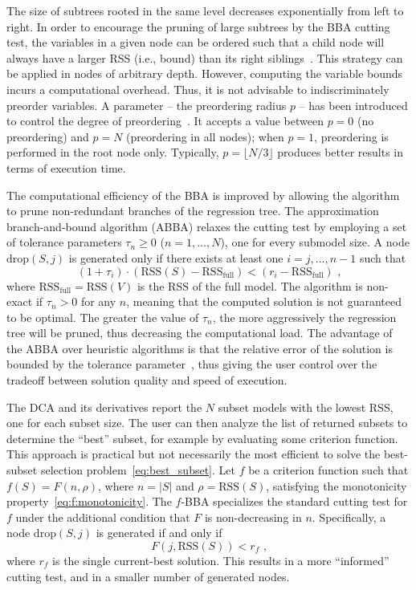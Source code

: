 \documentclass[article]{jss}
\newcommand{\qq}[1]{``{#1}''}
\newcommand{\drop}{\mathrm{drop}}
\newcommand{\rss}{\mathrm{RSS}}
\newcommand{\card}[1]{\left\lvert{#1}\right\rvert}
\begin{document}
The size of subtrees rooted in the same level decreases exponentially
from left to right.  In order to encourage the pruning of large
subtrees by the BBA cutting test, the variables in a given node can be
ordered such that a child node will always have a larger RSS (i.e.,
bound) than its right siblings~\citep{gatu:j_comput_graph_stat:06}.
This strategy can be applied in nodes of arbitrary depth.  However,
computing the variable bounds incurs a computational overhead.  Thus,
it is not advisable to indiscriminately preorder variables.  A
parameter -- the preordering radius $p$ -- has been introduced to
control the degree of
preordering~\citep{hofmann:comput_stat_data_an:07}.  It accepts a
value between $p=0$ (no preordering) and $p=N$ (preordering in all
nodes); when $p=1$, preordering is performed in the root node only.
Typically, $p=\lfloor N/3\rfloor$ produces better results in terms of
execution time.

The computational efficiency of the BBA is improved by allowing the
algorithm to prune non-redundant branches of the regression tree.  The
approximation branch-and-bound algorithm (ABBA) relaxes the cutting
test by employing a set of tolerance parameters $\tau_n\ge 0$
($n=1,\ldots,N$), one for every submodel size.  A node $\drop(S,j)$ is
generated only if there exists at least one $i=j,\ldots,n-1$ such that
%
\begin{equation}
  \label{eq:abba}
  (1+\tau_i)\cdot(\rss(S)-\rss_{\text{full}})<(r_i-\rss_{\text{full}})\text{ ,}
\end{equation}
%
where $\rss_{\text{full}}=\rss(V)$ is the RSS of the full model.  The
algorithm is non-exact if $\tau_n>0$ for any $n$, meaning that the
computed solution is not guaranteed to be optimal.  The greater the
value of $\tau_n$, the more aggressively the regression tree will be
pruned, thus decreasing the computational load.  The advantage of the
ABBA over heuristic algorithms is that the relative error of the
solution is bounded by the tolerance
parameter~\citep{gatu:j_comput_graph_stat:06,hofmann:comput_stat_data_an:07},
thus giving the user control over the tradeoff between solution
quality and speed of execution.

The DCA and its derivatives report the $N$ subset models with the
lowest RSS, one for each subset size.  The user can then analyze the
list of returned subsets to determine the \qq{best} subset, for
example by evaluating some criterion function.  This approach is
practical but not necessarily the most efficient to solve the
best-subset selection problem~\eqref{eq:best_subset}.  Let $f$ be a
criterion function such that $f(S)=F(n,\rho)$, where $n=\card{S}$ and
$\rho=\rss(S)$, satisfying the monotonicity
property~\eqref{eq:f:monotonicity}.  The $f$-BBA specializes the
standard cutting test for $f$ under the additional condition that $F$
is non-decreasing in $n$.  Specifically, a node $\drop(S,j)$ is
generated if and only if
%
\begin{equation}
  \label{eq:bba+}
  F(j,\rss(S))<r_f\text{ ,}
\end{equation}
%
where $r_f$ is the single current-best solution.  This results in a
more \qq{informed} cutting test, and in a smaller number of generated
nodes.
\end{document}
